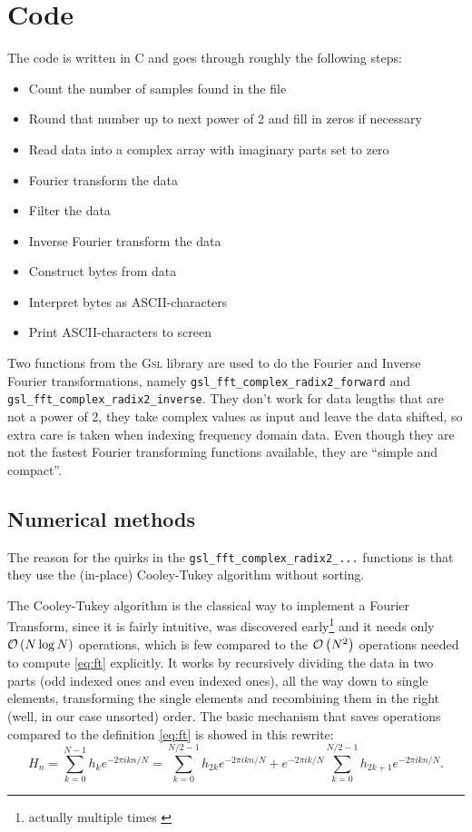 \documentclass[12pt,a4paper]{article}
\newcommand{\Gsl}{\textsc{Gsl}\xspace}
\newcommand{\ordo}[1]{{\cal O}\left( #1 \right)}
\begin{document}
\section{Code}\label{sec:code} %
The code is written in C and goes through roughly the following steps:
\begin{itemize}
  \item Count the number of samples found in the file
  \item Round that number up to next power of 2 and fill in zeros if necessary
  \item Read data into a complex array with imaginary parts set to zero
  \item Fourier transform the data
  \item Filter the data
  \item Inverse Fourier transform the data
  \item Construct bytes from data
  \item Interpret bytes as ASCII-characters
  \item Print ASCII-characters to screen
\end{itemize}

Two functions from the \Gsl library are used to do the Fourier and Inverse
Fourier transformations, namely \texttt{gsl\_fft\_complex\_radix2\_forward}
and \texttt{gsl\_fft\_complex\_radix2\_inverse}.
They don't work for data lengths that are not a power of 2,
they take complex values as input and leave the data shifted, so extra care is
taken when indexing frequency domain data.
Even though they are not the fastest Fourier transforming functions available,
they are ``simple and compact''\cite{gsl_doc}.

\subsection{Numerical methods}\label{sec:nm} %
The reason for the quirks in the \texttt{gsl\_fft\_complex\_radix2\_...}
functions is that they use the (in-place) Cooley-Tukey algorithm without sorting.

The Cooley-Tukey algorithm is the classical way to implement a Fourier Transform,
since it is fairly intuitive, was discovered early\footnote{actually multiple times \cite{cooley_tukey}}
and it needs only $\ordo{N\log{N}}$ operations, which is few compared to the $\ordo{N^2}$ operations needed to
compute \eqref{eq:ft} explicitly.
It works by recursively dividing the data in two parts (odd indexed ones and even indexed ones),
all the way down to single elements, transforming the single elements and recombining
them in the right (well, in our case unsorted) order.
The basic mechanism that saves operations compared to the definition \eqref{eq:ft}
is showed in this rewrite:
\begin{equation}\label{eq:divide_and_conquer}
  H_n = \sum_{k=0}^{N-1} h_ke^{-2\pi ikn/N}
      = \sum_{k=0}^{N/2-1} h_{2k}e^{-2\pi ikn/N} + e^{-2\pi ik/N} \sum_{k=0}^{N/2 - 1} h_{2k+1}e^{-2\pi ikn/N}.
\end{equation}
\end{document}
